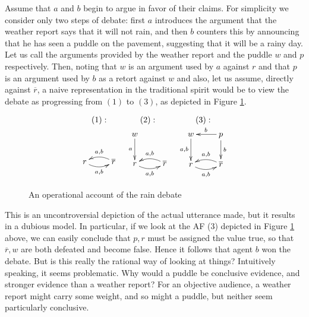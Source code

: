 \documentclass[greybox]{svmult}
\renewcommand{\bar}[1]{\overline{#1}}
\begin{document}
Assume that $a$ and $b$ begin to argue in favor of their claims. For simplicity we consider only two steps of debate: first $a$ introduces the argument that the weather report says that it will not rain, and then $b$ counters this by announcing that he has seen a puddle on the pavement, suggesting that it will be a rainy day. Let us call the arguments provided by the weather report and the puddle $w$ and $p$ respectively. Then, noting that $w$ is an argument used by $a$ against $r$ and that $p$ is an argument used by $b$ as a retort against $w$ and also, let us assume, directly against $\bar r$, a naive representation in the traditional spirit would be to view the debate as progressing from $(1)$ to $(3)$, as depicted in Figure \ref{fig:wrong}.
\begin{figure}
$$
\begin{array}{ccc}
(1): & (2): & (3): \\
\xymatrix{ \\ r\ar@/_/[r]_{a,b} & \bar{r}\ar@/_/[l]_{a,b} } &
\xymatrix{
        w\ar[d]_{a} & \\
        r\ar@/_/[r]_{a,b} & \bar{r}\ar@/_/[l]_{a,b} } &
\xymatrix{
        w\ar[d]_{a,b} & p \ar[l]_{b} \ar[d]^{b} \\
        r\ar@/_/[r]_{{a},{b}} & \bar{r}\ar@/_/[l]_{{a},{b}} }
\end{array}
$$
\caption{An operational account of the rain debate}
\label{fig:wrong}
\end{figure}

This is an uncontroversial depiction of the actual utterance made, but it results in a dubious model. In particular, if we look at the AF (3) depicted in Figure \ref{fig:wrong} above, we can easily conclude that $p, r$ must be assigned the value true, so that $\bar r, w$ are both defeated and become false. Hence it follows that agent ${b}$ won the debate. But is this really the rational way of looking at things?  Intuitively speaking, it seems problematic. Why would a puddle be conclusive evidence, and stronger evidence than a weather report? For an objective audience, a weather report might carry some weight, and so might a puddle, but neither seem particularly conclusive.
\end{document}

